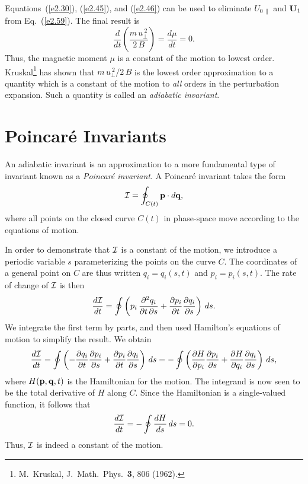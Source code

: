 Equations~(\ref{e2.30}), (\ref{e2.45}), and (\ref{e2.46}) can be used to eliminate $U_{0\,\parallel}$
and ${\bf U}_1$ from Eq.~(\ref{e2.59}). The final result is
\begin{equation}
\frac{d}{dt}\!\left(\frac{ m\,u_\perp^{~2}}{2\,B}\right) = \frac{d\mu}{dt} = 0.
\end{equation}
Thus, the magnetic moment $\mu$ is a constant of the motion to lowest order.
Kruskal\footnote{M.~Kruskal, J.\ Math.\ Phys.\ {\bf 3}, 806
(1962).} has shown that $m\,u_\perp^{~2}/2\,B$ is the lowest order 
approximation to a quantity which is a constant of the motion to
{\em all}\/ orders in the perturbation expansion. Such a quantity
is called an {\em adiabatic invariant}.

\section{Poincar\'{e} Invariants}
An adiabatic invariant is an approximation to a more fundamental type of
invariant known as a {\em Poincar\'{e} invariant}. A Poincar\'{e} invariant
takes the form
\begin{equation}
{\cal I} = \oint_{C(t)} {\bf p}\cdot d{\bf q},
\end{equation}
where all points on the closed curve $C(t)$ in phase-space move
according to the equations of motion. 

In order to demonstrate that ${\cal I}$ is a constant of the motion, we
introduce a periodic variable $s$ parameterizing the points on the curve $C$.
The coordinates of a general point on $C$ are thus written $q_i = q_i(s,t)$
and $p_i=p_i(s,t)$. The rate of change of ${\cal I}$ is then
\begin{equation}
\frac{d{\cal I}}{dt} =\oint\left(p_i\,\frac{\partial^2 q_i}{\partial t\,\partial s}
+\frac{\partial p_i}{\partial t} \frac{\partial q_i}{\partial s}\right)\,ds.
\end{equation}
We integrate the first term by parts, and then used Hamilton's
equations of motion to simplify the result. We obtain
\begin{equation}
\frac{d{\cal I}}{dt} =\oint\left( -
 \frac{\partial q_i}{\partial t}\frac{\partial p_i}{\partial s}
+\frac{\partial p_i}{\partial t} \frac{\partial q_i}{\partial s}\right)\,ds
=-\oint\left(
 \frac{\partial H}{\partial p_i}\frac{\partial p_i}{\partial s}+\frac{\partial H}{\partial q_i}
 \frac{\partial q_i}{\partial s}\right)\,ds,
\end{equation}
where $H({\bf p}, {\bf q}, t)$ is the Hamiltonian for the motion.
The integrand is now seen to be the total derivative of $H$ along $C$. 
Since the Hamiltonian is a single-valued function, it follows that
\begin{equation}
\frac{d{\cal I}}{dt} =-\oint\frac{d H}{ds}\,ds =0.
\end{equation}
Thus, ${\cal I}$ is indeed a constant of the motion. 

